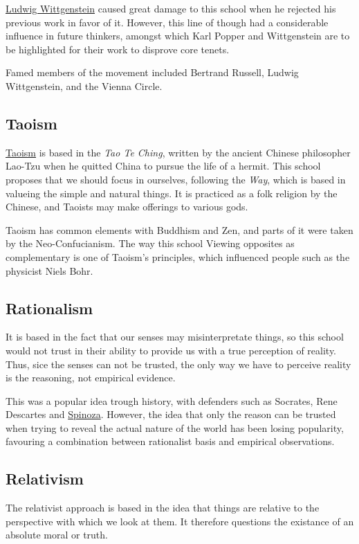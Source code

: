 \documentclass[../my_knowledge.tex]{subfiles}
\begin{document}
\href{https://www.youtube.com/watch?v=pQ33gAyhg2c}{Ludwig Wittgenstein} caused great damage to this school when he rejected his previous work in favor of it. However, this line of though had a considerable influence in future thinkers, amongst which Karl Popper and Wittgenstein are to be highlighted for their work to disprove core tenets.

Famed members of the movement included Bertrand Russell, Ludwig Wittgenstein, and the Vienna Circle.

\subsection{Taoism}
\href{https://www.youtube.com/watch?v=dFb7Hxva5rg}{Taoism} is based in the \textit{Tao Te Ching}, written by the ancient Chinese philosopher Lao-Tzu when he quitted China to pursue the life of a hermit. This school proposes that we should focus in ourselves, following the \textit{Way}, which is based in valueing the simple and natural things. It is practiced as a folk religion by the Chinese, and Taoists may make offerings to various gods.

Taoism has common elements with Buddhism and Zen, and parts of it were taken by the Neo-Confucianism. The way this school Viewing opposites as complementary is one of Taoism's principles, which influenced people such as the physicist Niels Bohr. 

\subsection{Rationalism}
It is based in the fact that our senses may misinterpretate things, so this school would not trust in their ability to provide us with a true perception of reality. Thus, sice the senses can not be trusted, the only way we have to perceive reality is the reasoning, not empirical evidence.

This was a popular idea trough history, with defenders such as Socrates, Rene Descartes and \href{https://www.youtube.com/watch?v=pVEeXjPiw54}{Spinoza}. However, the idea that only the reason can be trusted when trying to reveal the actual nature of the world has been losing popularity, favouring a combination between rationalist basis and empirical observations.

\subsection{Relativism}
The relativist approach is based in the idea that things are relative to the perspective with which we look at them. It therefore questions the existance of an absolute moral or truth.
\end{document}
